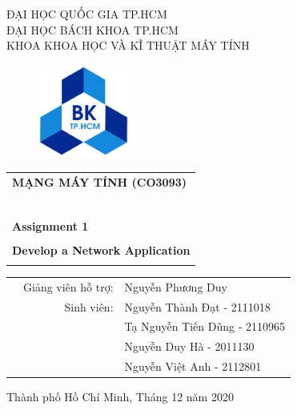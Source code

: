 \documentclass[a4paper]{article}
\begin{document}
	
	\begin{titlepage}
		\begin{center}
			ĐẠI HỌC QUỐC GIA TP.HCM \\
			ĐẠI HỌC BÁCH KHOA TP.HCM \\
			KHOA KHOA HỌC VÀ KĨ THUẬT MÁY TÍNH
		\end{center}
		
		\vspace{1cm}
		
		\begin{figure}[h!]
			\begin{center}
				\includegraphics[width=3cm]{images/hcmut.png}
			\end{center}
		\end{figure}
		
		\vspace{1cm}
		
		
		\begin{center}
			\begin{tabular}{c}
				\multicolumn{1}{l}{\textbf{{\Large MẠNG MÁY TÍNH (CO3093)}}}\\
				~~\\
				\hline
				\\
				\multicolumn{1}{l}{\textbf{{\Large Assignment 1}}}\\
				\\
				\textbf{{\Huge Develop a Network Application}}\\
				\\
				\hline
			\end{tabular}
		\end{center}
		
		\vspace{3cm}
		
		\begin{table}[h]
			\begin{tabular}{rrl}
				\hspace{5 cm} & Giảng viên hỗ trợ: & Nguyễn Phương Duy\\
				& Sinh viên: & Nguyễn Thành Đạt - 2111018 \\
				& & Tạ Nguyễn Tiến Dũng - 2110965 \\
				& & Nguyễn Duy Hà - 2011130 \\
				& & Nguyễn Việt Anh - 2112801
			\end{tabular}
		\end{table}
		
		\begin{center}
			{\footnotesize Thành phố Hồ Chí Minh, Tháng 12 năm 2020}
		\end{center}
	\end{titlepage}
	
\end{document}
